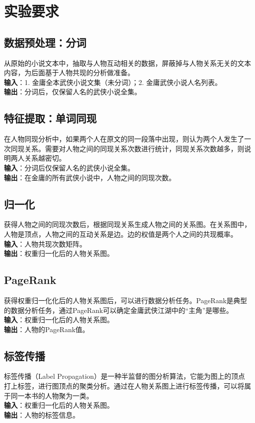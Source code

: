\section{实验要求}
\subsection{数据预处理：分词}
从原始的小说文本中，抽取与人物互动相关的数据，屏蔽掉与人物关系无关的文本内容，为后面基于人物共现的分析做准备。\\
\textbf{输入}：1. 金庸全本武侠小说文集（未分词）；2. 金庸武侠小说人名列表。\\
\textbf{输出}：分词后，仅保留人名的武侠小说全集。
\subsection{特征提取：单词同现}
在人物同现分析中，如果两个人在原文的同一段落中出现，则认为两个人发生了一次同现关系。需要对人物之间的同现关系次数进行统计，同现关系次数越多，则说明两人关系越密切。\\
\textbf{输入}：分词后仅保留人名的武侠小说全集。\\
\textbf{输出}：在金庸的所有武侠小说中，人物之间的同现次数。
\subsection{归一化}
获得人物之间的同现次数后，根据同现关系生成人物之间的关系图。在关系图中，人物是顶点，人物之间的互动关系是边。边的权值是两个人之间的共现概率。\\
\textbf{输入}：人物共现次数矩阵。\\
\textbf{输出}：权重归一化后的人物关系图。
\subsection{PageRank}
获得权重归一化化后的人物关系图后，可以进行数据分析任务。PageRank是典型的数据分析任务，通过PageRank可以确定金庸武侠江湖中的“主角”是哪些。\\
\textbf{输入}：权重归一化后的人物关系图。
\\\textbf{输出}：人物的PageRank值。
\subsection{标签传播}
标签传播（Label Propagation）是一种半监督的图分析算法，它能为图上的顶点打上标签，进行图顶点的聚类分析。通过在人物关系图上进行标签传播，可以将属于同一本书的人物聚为一类。\\
\textbf{输入}：权重归一化后的人物关系图。\\
\textbf{输出}：人物的标签信息。
